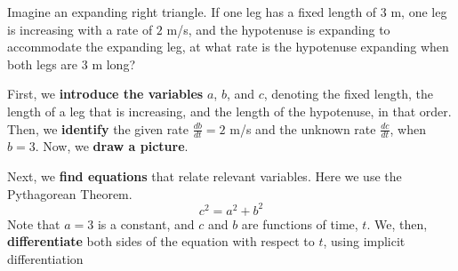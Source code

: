 \documentclass{ximera}
\begin{document}
	\begin{example}
		Imagine an expanding right triangle. If one leg has a fixed length
		of $3$ m, one leg is increasing with a rate of $2$ m/s, and the
		hypotenuse is expanding to accommodate the expanding leg, at what
		rate is the hypotenuse expanding when both legs are $3$ m long?
		\begin{explanation}
			First, we \textbf{introduce the variables}  $a$, $b$, and $c$, denoting the fixed length, the length of a leg that is increasing, 
			and  the length of the hypotenuse, in that order. Then, we \textbf{identify} the given rate $\frac{db}{dt}=2$ m/s and the unknown rate $\frac{dc}{dt}$, when $b=3$.
			Now, we \textbf{draw a picture}.
			\begin{image}
			\end{image}
			
			Next, we  \textbf{find equations} that relate relevant
			variables. Here we use the Pythagorean Theorem.
			\[
			c^2 = a^2 + b^2
			\]
			Note that $a=3$ is a constant, and $c$ and $b$ are functions of time, $t$.
			We, then, \textbf{differentiate} both sides of the equation with respect to $t$,  using  implicit differentiation
			

\end{explanation}
\end{example}
\end{document}
